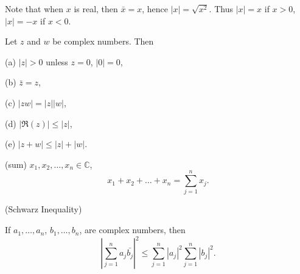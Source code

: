 Note that when $x$ is real, then $\bar{x} = x$, hence $|x| = \sqrt{x^2}$. Thus $|x| = x$
if $x>0$, $|x| = -x$ if $x <0$.

\begin{thm}\label{thm:1.33}
    Let $z$ and $w$ be complex numbers. Then
    
    (a) $|z|>0$ unless $z=0$, $|0|=0$,

    (b) $\bar{z}=z$,

    (c) $|zw| = |z||w|$,

    (d) $| \Re(z)| \leq |z|$,

    (e) $|z+w| \leq|z|+|w|$.

\end{thm}


\begin{myNotation}\label{myNotation:sum}
(sum)
$x_1,x_2,\dots,x_n \in \mathbb{C}$,
\begin{equation*}
    x_1+x_2+\dots+x_n = \sum_{j=1}^{n} x_j.
\end{equation*}
\end{myNotation}

\begin{thm}\label{thm:schwarz_inequality}
    (Schwarz Inequality)

    If 
    $a_1,\dots,a_n$, 
    $b_1,\dots,b_n$, are complex numbers, then
    \begin{equation*}
        \left| \sum_{j=1}^{n}a_j \bar{b_j}\right|^2 \leq 
        \sum_{j=1}^{n}\left|a_j\right|^2
        \sum_{j=1}^{n}\left|b_j\right|^2.
    \end{equation*}    
\end{thm}

